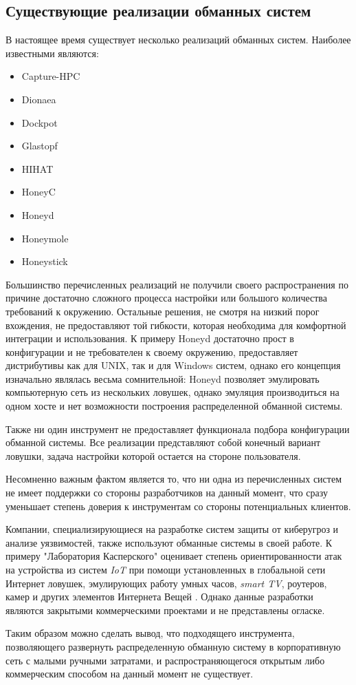 \subsection{Существующие реализации обманных систем}

В настоящее время существует несколько реализаций обманных систем. Наиболее известными являются\citep{honeynet}:
\begin{itemize}
\item Capture-HPC
\item Dionaea
\item Dockpot
\item Glastopf
\item HIHAT
\item HoneyC
\item Honeyd
\item Honeymole
\item Honeystick
\end{itemize}

Большинство перечисленных реализаций не получили своего распространения по причине достаточно сложного процесса настройки или большого количества требований к окружению. Остальные решения, не смотря на низкий порог вхождения, не предоставляют той гибкости, которая необходима для комфортной интеграции и использования. К примеру Honeyd достаточно прост в конфигурации и не требователен к своему окружению, предоставляет дистрибутивы как для UNIX, так и для Windows систем, однако его концепция изначально являлась весьма сомнительной: Honeyd позволяет эмулировать компьютерную сеть из нескольких ловушек, однако эмуляция производиться на одном хосте и нет возможности построения распределенной обманной системы.

Также ни один инструмент не предоставляет функционала подбора конфигурации обманной системы. Все реализации представляют собой конечный вариант ловушки, задача настройки которой остается на стороне пользователя.

Несомненно важным фактом является то, что ни одна из перечисленных систем не имеет поддержки со стороны разработчиков на данный момент, что сразу уменьшает степень доверия к инструментам со стороны потенциальных клиентов.

Компании, специализирующиеся на разработке систем защиты от киберугроз и анализе уязвимостей, также используют обманные системы в своей работе. К примеру "Лаборатория Касперского" оценивает степень ориентированности атак на устройства из систем \textit{IoT} при помощи установленных в глобальной сети Интернет ловушек, эмулирующих работу умных часов, \textit{smart TV}, роутеров, камер и других элементов Интернета Вещей \citep{kaspersky}. Однако данные разработки являются закрытыми коммерческими проектами и не представлены огласке.

Таким образом можно сделать вывод, что подходящего инструмента, позволяющего развернуть распределенную обманную систему в корпоративную сеть с малыми ручными затратами, и распространяющегося открытым либо коммерческим способом на данный момент не существует.